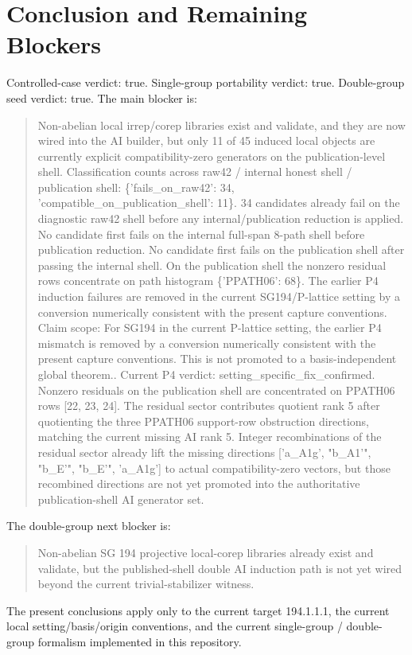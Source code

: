\documentclass[11pt]{article}
\begin{document}
\section{Conclusion and Remaining Blockers}
Controlled-case verdict: true. Single-group portability verdict: true. Double-group seed verdict: true. The main blocker is:
\begin{quote}
Non-abelian local irrep/corep libraries exist and validate, and they are now wired into the AI builder, but only 11 of 45 induced local objects are currently explicit compatibility-zero generators on the publication-level shell. Classification counts across raw42 / internal honest shell / publication shell: \{'fails\_on\_raw42': 34, 'compatible\_on\_publication\_shell': 11\}. 34 candidates already fail on the diagnostic raw42 shell before any internal/publication reduction is applied. No candidate first fails on the internal full-span 8-path shell before publication reduction. No candidate first fails on the publication shell after passing the internal shell. On the publication shell the nonzero residual rows concentrate on path histogram \{'PPATH06': 68\}. The earlier P4 induction failures are removed in the current SG194/P-lattice setting by a conversion numerically consistent with the present capture conventions. Claim scope: For SG194 in the current P-lattice setting, the earlier P4 mismatch is removed by a conversion numerically consistent with the present capture conventions. This is not promoted to a basis-independent global theorem.. Current P4 verdict: setting\_specific\_fix\_confirmed. Nonzero residuals on the publication shell are concentrated on PPATH06 rows [22, 23, 24]. The residual sector contributes quotient rank 5 after quotienting the three PPATH06 support-row obstruction directions, matching the current missing AI rank 5. Integer recombinations of the residual sector already lift the missing directions ['a\_A1g', "b\_A1'", "b\_E'", "b\_E'", 'a\_A1g'] to actual compatibility-zero vectors, but those recombined directions are not yet promoted into the authoritative publication-shell AI generator set.
\end{quote}
The double-group next blocker is:
\begin{quote}
Non-abelian SG 194 projective local-corep libraries already exist and validate, but the published-shell double AI induction path is not yet wired beyond the current trivial-stabilizer witness.
\end{quote}
The present conclusions apply only to the current target 194.1.1.1, the current local setting/basis/origin conventions, and the current single-group / double-group formalism implemented in this repository.
\end{document}
